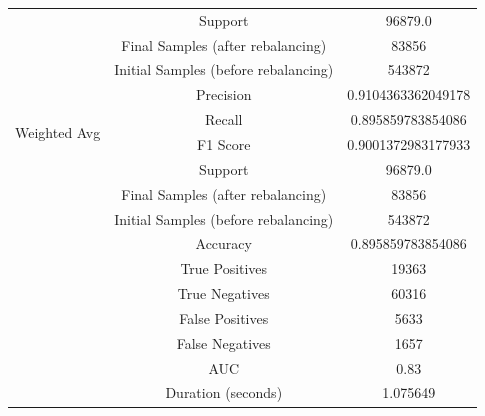 \begin{longtable}{|c|c|c|}
 & Support & 96879.0 \\
 & Final Samples (after rebalancing) & 83856 \\
 & Initial Samples (before rebalancing) & 543872 \\
\hline
\multirow{4}{*}{Weighted Avg} & Precision & 0.9104363362049178 \\
 & Recall & 0.895859783854086 \\
 & F1 Score & 0.9001372983177933 \\
 & Support & 96879.0 \\
 & Final Samples (after rebalancing) & 83856 \\
 & Initial Samples (before rebalancing) & 543872 \\
\hline
& Accuracy & 0.895859783854086 \\ \hline
& True Positives & 19363 \\ \hline
& True Negatives & 60316 \\ \hline
& False Positives & 5633 \\ \hline
& False Negatives & 1657 \\ \hline
& AUC & 0.83 \\ \hline
& Duration (seconds) & 1.075649 \\ \hline
\end{longtable}


